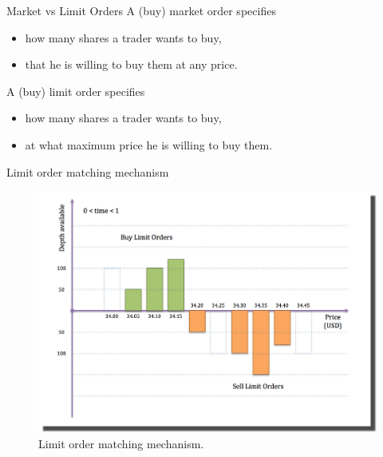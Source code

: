 \documentclass{beamer}
\begin{document}
\begin{frame}[shrink=25]{{\color{cyan}Market vs Limit Orders}}
\bigskip
A (buy) market order specifies
\vspace{5pt}
\begin{itemize}
\item how many shares a trader wants to buy,
\vspace{5pt}
\item that he is willing to buy them at any price.
\end{itemize}

\bigskip
A (buy) limit order specifies
\vspace{5pt}
\begin{itemize}
\item how many shares a trader wants to buy,
\vspace{5pt}
\item at what maximum price he is willing to buy them.
\end{itemize}

\end{frame}

\begin{frame}[shrink=30]{{\color{cyan}Limit order matching mechanism}}
\bigskip
\begin{figure}[H]
	\centering
	\includegraphics[height=0.9\textheight]{LOB_Match/LOB_Match_0.png}
        \caption{Limit order matching mechanism.}
        \label{fig:LOB_0}
\end{figure}
\end{frame}
\end{document}

